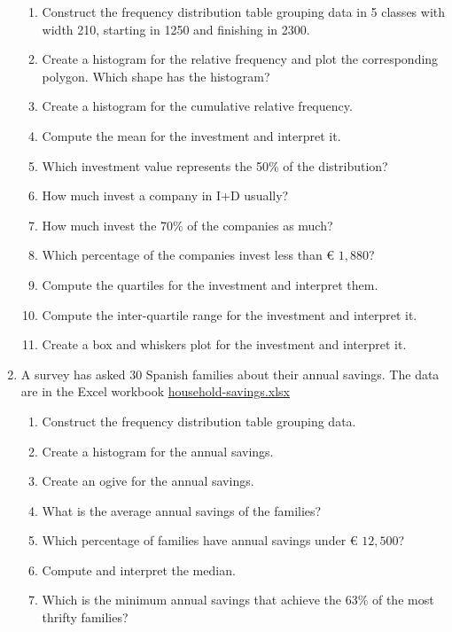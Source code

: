\begin{enumerate}[leftmargin=*,resume]
\begin{enumerate}
\item Construct the frequency distribution table grouping data in 5 classes with width 210, starting in 1250 and
finishing in 2300.
\item Create a histogram for the relative frequency and plot the corresponding polygon.  
Which shape has the histogram?
\item Create a histogram for the cumulative relative frequency. 
\item Compute the mean for the investment and interpret it. 
\item Which investment value represents the 50\% of the distribution?
\item How much invest a company in I+D usually?
\item How much invest the 70\% of the companies as much?
\item Which percentage of the companies invest less than € $1,880$?
\item Compute the quartiles for the investment and interpret them. 
\item Compute the inter-quartile range for the investment and interpret it. 
\item Create a box and whiskers plot for the investment and interpret it. 
\end{enumerate}


\item\label{household-savings} A survey has asked 30 Spanish families about their annual savings. 
The data are in the Excel workbook
\href{http://aprendeconalf.es/office/excel/exercises/descriptive-statistics/household-savings.xlsx}{\textsf{household-savings.xlsx}}
\begin{enumerate}
\item Construct the frequency distribution table grouping data. 
\item Create a histogram for the annual savings. 
\item Create an ogive for the annual savings. 
\item What is the average annual savings of the families?
\item Which percentage of families have annual savings under € $12,500$?
\item Compute and interpret the median. 
\item Which is the minimum annual savings that achieve the 63\% of the most thrifty families?
\end{enumerate}



\end{enumerate}
